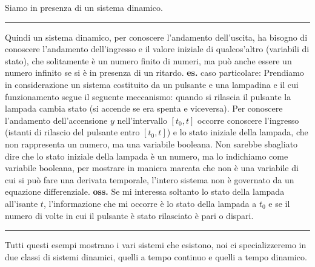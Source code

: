 Siamo in presenza di un sistema dinamico.\newline
\rule{\textwidth}{0,4pt}\newline
\newline
Quindi un sistema dinamico, per conoscere l'andamento dell'uscita, ha bisogno di conoscere l'andamento dell'ingresso e il valore iniziale di qualcos'altro (variabili di stato), che solitamente è un numero finito di numeri, ma può anche essere un numero infinito se si è in presenza di un ritardo.\newline
\newline
\textbf{es.} caso particolare:\newline
Prendiamo in considerazione un sistema costituito da un pulsante e una lampadina e il cui funzionamento segue il seguente meccanismo: quando si rilascia il pulsante la lampada cambia stato (si accende se era spenta e viceversa).\newline
Per conoscere l'andamento dell'accensione $y$ nell'intervallo $[t_0,t]$ occorre conoscere l'ingresso (istanti di rilascio del pulsante entro $[t_0,t]$) e lo stato iniziale della lampada, che non rappresenta un numero, ma una variabile booleana. Non sarebbe sbagliato dire che lo stato iniziale della lampada è un numero, ma lo indichiamo come variabile booleana, per mostrare in maniera marcata che non è una variabile di cui si può fare una derivata temporale, l'intero sistema non è governato da un equazione differenziale.\newline
\textbf{oss.} Se mi interessa soltanto lo stato della lampada all'isante $t$, l'informazione che mi occorre è lo stato della lampada a $t_0$ e se il numero di volte in cui il pulsante è stato rilasciato è pari o dispari.\newline
\rule{\textwidth}{0,4pt}\newline
\newline
Tutti questi esempi mostrano i vari sistemi che esistono, noi ci specializzeremo in due classi di sistemi dinamici, quelli a tempo continuo e quelli a tempo dinamico.
